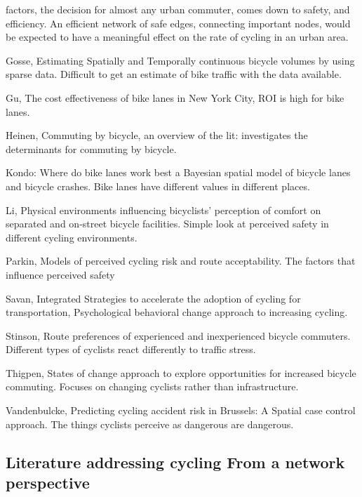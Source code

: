 \documentclass[11pt]{article} %
\begin{document}
factors, the decision for almost any urban commuter, comes down to safety, and efficiency. An efficient network of safe edges, connecting important nodes, would be expected to have a meaningful effect on the rate of cycling in an urban area.  

Gosse, Estimating Spatially and Temporally continuous bicycle volumes by using sparse data. Difficult to get an estimate of bike traffic with the data available. \cite{gosse2014estimating}

Gu, The cost effectiveness of bike lanes in New York City, ROI is high for bike lanes. \cite{gu2017cost}

Heinen, Commuting by bicycle, an overview of the lit: investigates the determinants for commuting by bicycle. \cite{heinen2010commuting}

Kondo: Where do bike lanes work best a Bayesian spatial model of bicycle lanes and bicycle crashes. Bike lanes have different values in different places. \cite{kondo2018bike}

Li, Physical environments influencing bicyclists' perception of comfort on separated and on-street bicycle facilities. Simple look at perceived safety in different cycling environments. \cite{li2012physical}

Parkin, Models of perceived cycling risk and route acceptability. The factors that influence perceived safety \cite{parkin2007models}

Savan, Integrated Strategies to accelerate the adoption of cycling for transportation, Psychological behavioral change approach to increasing cycling. \cite{savan2017integrated}

Stinson, Route preferences of experienced and inexperienced bicycle commuters. Different types of cyclists react differently to traffic stress. \cite{stinson2005comparison}

Thigpen, States of change approach to explore opportunities for increased bicycle commuting. Focuses on changing cyclists rather than infrastructure. \cite{thigpen2015using}

Vandenbulcke, Predicting cycling accident risk in Brussels: A Spatial case control approach. The things cyclists perceive as dangerous are dangerous. \cite{vandenbulcke2014predicting}


\subsection{Literature addressing cycling From a network perspective}
\end{document}

